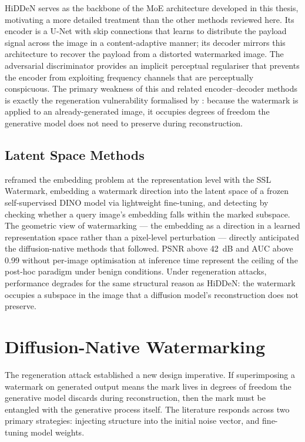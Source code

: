 ﻿\documentclass[12pt, a4paper, twoside]{report}
\numberwithin{equation}{chapter}
\begin{document}
HiDDeN serves as the backbone of the MoE architecture developed in this thesis, motivating a more detailed treatment than the other methods reviewed here. Its encoder is a U-Net with skip connections that learns to distribute the payload signal across the image in a content-adaptive manner; its decoder mirrors this architecture to recover the payload from a distorted watermarked image. The adversarial discriminator provides an implicit perceptual regulariser that prevents the encoder from exploiting frequency channels that are perceptually conspicuous. The primary weakness of this and related encoder--decoder methods is exactly the regeneration vulnerability formalised by \cite{zhao2023}: because the watermark is applied to an already-generated image, it occupies degrees of freedom the generative model does not need to preserve during reconstruction.

\subsection*{Latent Space Methods}

\cite{fernandez2022} reframed the embedding problem at the representation level with the SSL Watermark, embedding a watermark direction into the latent space of a frozen self-supervised DINO model via lightweight fine-tuning, and detecting by checking whether a query image's embedding falls within the marked subspace. The geometric view of watermarking --- the embedding as a direction in a learned representation space rather than a pixel-level perturbation --- directly anticipated the diffusion-native methods that followed. PSNR above 42~dB and AUC above 0.99 without per-image optimisation at inference time represent the ceiling of the post-hoc paradigm under benign conditions. Under regeneration attacks, performance degrades for the same structural reason as HiDDeN: the watermark occupies a subspace in the image that a diffusion model's reconstruction does not preserve.

\section{Diffusion-Native Watermarking}

The regeneration attack established a new design imperative. If superimposing a watermark on generated output means the mark lives in degrees of freedom the generative model discards during reconstruction, then the mark must be entangled with the generative process itself. The literature responds across two primary strategies: injecting structure into the initial noise vector, and fine-tuning model weights.
\end{document}
